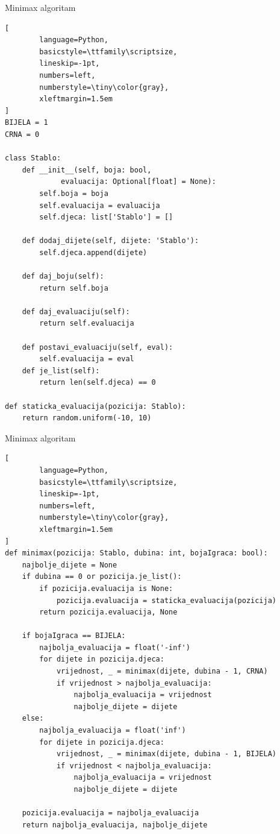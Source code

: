 \documentclass[aspectratio=43]{beamer}
\begin{document}
\begin{frame}[fragile]{Minimax algoritam}
	\begin{lstlisting}[
    	language=Python,
    	basicstyle=\ttfamily\scriptsize,
    	lineskip=-1pt,
    	numbers=left,
    	numberstyle=\tiny\color{gray},
    	xleftmargin=1.5em
]
BIJELA = 1
CRNA = 0

class Stablo:
    def __init__(self, boja: bool, 
    		 evaluacija: Optional[float] = None):
        self.boja = boja
        self.evaluacija = evaluacija
        self.djeca: list['Stablo'] = []

    def dodaj_dijete(self, dijete: 'Stablo'):
        self.djeca.append(dijete)

    def daj_boju(self):
        return self.boja
    
    def daj_evaluaciju(self):
        return self.evaluacija

    def postavi_evaluaciju(self, eval):
        self.evaluacija = eval
    def je_list(self):
        return len(self.djeca) == 0

def staticka_evaluacija(pozicija: Stablo):
    return random.uniform(-10, 10)
	\end{lstlisting}
\end{frame}

\begin{frame}[fragile]{Minimax algoritam}
	\begin{lstlisting}[
    	language=Python,
    	basicstyle=\ttfamily\scriptsize,
    	lineskip=-1pt,
    	numbers=left,
    	numberstyle=\tiny\color{gray},
    	xleftmargin=1.5em
]
def minimax(pozicija: Stablo, dubina: int, bojaIgraca: bool):
    najbolje_dijete = None
    if dubina == 0 or pozicija.je_list():
        if pozicija.evaluacija is None:
            pozicija.evaluacija = staticka_evaluacija(pozicija)
        return pozicija.evaluacija, None

    if bojaIgraca == BIJELA:
        najbolja_evaluacija = float('-inf')
        for dijete in pozicija.djeca:
            vrijednost, _ = minimax(dijete, dubina - 1, CRNA)
            if vrijednost > najbolja_evaluacija:
                najbolja_evaluacija = vrijednost
                najbolje_dijete = dijete
    else:
        najbolja_evaluacija = float('inf')
        for dijete in pozicija.djeca:
            vrijednost, _ = minimax(dijete, dubina - 1, BIJELA)
            if vrijednost < najbolja_evaluacija:
                najbolja_evaluacija = vrijednost
                najbolje_dijete = dijete

    pozicija.evaluacija = najbolja_evaluacija   
    return najbolja_evaluacija, najbolje_dijete
	\end{lstlisting}
\end{frame}
\end{document}
